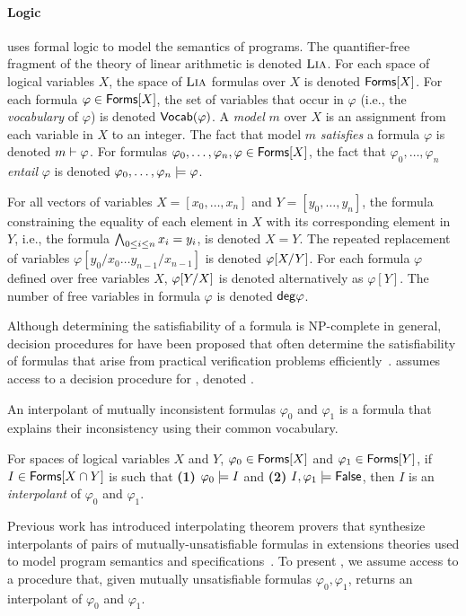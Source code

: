 \paragraph{Logic}
%
\sys uses formal logic to model the semantics of programs.
%
The quantifier-free fragment of the theory of linear arithmetic is
denoted $\lia$.
%
For each space of logical variables $X$, the space of $\lia$ formulas
over $X$ is denoted $\formulas{X}$.
%
For each formula $\varphi \in \formulas{X}$, the set of variables that
occur in $\varphi$ (i.e., the \emph{vocabulary} of $\varphi$) is
denoted $\vocab(\varphi)$.
A \lia \emph{model} $m$ over $X$ is an assignment from each variable
in $X$ to an integer.
%
The fact that model $m$ \emph{satisfies} a formula $\varphi$ is
denoted $m \sats \varphi$.
%
For formulas $\varphi_0, \ldots, \varphi_n, \varphi \in \formulas{X}$,
the fact that $\varphi_0, \ldots, \varphi_n$ \emph{entail} $\varphi$
is denoted $\varphi_0, \ldots, \varphi_n \entails \varphi$.

For all vectors of variables $X = [ x_0, \ldots, x_n ]$ and $Y = [
y_0, \ldots, y_n ]$, the \lia formula constraining the equality of
each element in $X$ with its corresponding element in $Y$, i.e., the
formula $\bigland_{0 \leq i \leq n} x_i = y_i$, is denoted $X = Y$.
%
The repeated replacement of variables $\varphi[ y_0 / x_0 \ldots y_{n
  - 1} / x_{n - 1} ]$ is denoted $\replace{\varphi}{Y}{X}$.
%
For each formula $\varphi$ defined over free variables $X$,
$\replace{\varphi}{X}{Y}$ is denoted alternatively as $\varphi[Y]$.
%
The number of free variables in formula $\varphi$ is denoted
$\degreeof{\varphi}$.

Although determining the satisfiability of a \lia formula is
NP-complete in general, decision procedures for \lia have been
proposed that often determine the satisfiability of formulas that
arise from practical verification problems
efficiently~\cite{demoura08}.
%
\sys assumes access to a decision procedure for \lia, denoted \issat.

An interpolant of mutually inconsistent formulas $\varphi_0$ and
$\varphi_1$ is a \lia formula that explains their inconsistency using
their common vocabulary.
%
\begin{defn}
  \label{defn:itps}
  For spaces of logical variables $X$ and $Y$,
  $\varphi_0 \in \formulas{X}$ and
  $\varphi_1 \in \formulas{Y}$,
  if $I \in \formulas{X \intersection Y}$ is such that 
  \textbf{(1)} $\varphi_0 \entails I$ and %
  \textbf{(2)} $I, \varphi_1 \entails \false$, then $I$ is an
  \emph{interpolant} of $\varphi_0$ and $\varphi_1$.
\end{defn}
%
Previous work has introduced interpolating theorem provers that
synthesize interpolants of pairs of mutually-unsatisfiable formulas in
extensions theories used to model program semantics and
specifications~\cite{mcmillan04}.
%
To present \sys, we assume access to a procedure \solveitp that, given
mutually unsatisfiable \lia formulas $\varphi_0, \varphi_1$, returns
an interpolant of $\varphi_0$ and $\varphi_1$.

